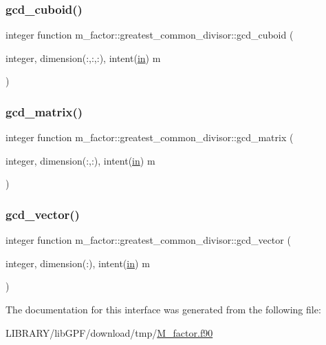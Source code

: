 \subsubsection{\texorpdfstring{gcd\+\_\+cuboid()}{gcd\_cuboid()}}
{\footnotesize\ttfamily integer function m\+\_\+factor\+::greatest\+\_\+common\+\_\+divisor\+::gcd\+\_\+cuboid (\begin{DoxyParamCaption}\item[{integer, dimension(\+:,\+:,\+:), intent(\hyperlink{M__journal_83_8txt_afce72651d1eed785a2132bee863b2f38}{in})}]{m }\end{DoxyParamCaption})\hspace{0.3cm}{\ttfamily [private]}}

\mbox{\label{interfacem__factor_1_1greatest__common__divisor_a4222039246a4ae0dd1b1dbc8acd15e43}} 
\subsubsection{\texorpdfstring{gcd\+\_\+matrix()}{gcd\_matrix()}}
{\footnotesize\ttfamily integer function m\+\_\+factor\+::greatest\+\_\+common\+\_\+divisor\+::gcd\+\_\+matrix (\begin{DoxyParamCaption}\item[{integer, dimension(\+:,\+:), intent(\hyperlink{M__journal_83_8txt_afce72651d1eed785a2132bee863b2f38}{in})}]{m }\end{DoxyParamCaption})\hspace{0.3cm}{\ttfamily [private]}}

\mbox{\label{interfacem__factor_1_1greatest__common__divisor_a19a227039630336f719838eb941fa28f}} 
\subsubsection{\texorpdfstring{gcd\+\_\+vector()}{gcd\_vector()}}
{\footnotesize\ttfamily integer function m\+\_\+factor\+::greatest\+\_\+common\+\_\+divisor\+::gcd\+\_\+vector (\begin{DoxyParamCaption}\item[{integer, dimension(\+:), intent(\hyperlink{M__journal_83_8txt_afce72651d1eed785a2132bee863b2f38}{in})}]{m }\end{DoxyParamCaption})\hspace{0.3cm}{\ttfamily [private]}}



The documentation for this interface was generated from the following file\+:\begin{DoxyCompactItemize}
\item 
L\+I\+B\+R\+A\+R\+Y/lib\+G\+P\+F/download/tmp/\hyperlink{M__factor_8f90}{M\+\_\+factor.\+f90}\end{DoxyCompactItemize}
